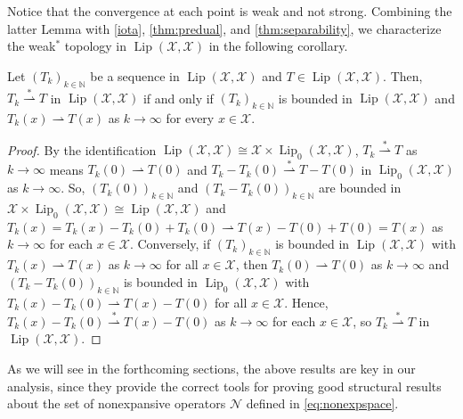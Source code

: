 \documentclass[onefignum,onetabnum]{siamonline250211}
\newcommand{\Lip}{\operatorname{Lip}}
\newcommand{\N}{\mathcal{N}}
\newcommand{\weakk}{\stackrel{\ast}{\rightharpoonup}}
\newcommand{\cX}{\mathcal{X}}
\begin{document}
Notice that the convergence at each point is weak and not strong. Combining the latter Lemma with \cref{iota}, \cref{thm:predual}, and \cref{thm:separability}, we characterize the weak$^*$ topology in $\Lip(\cX, \cX)$ in the following corollary.
\begin{corollary}\label{topo}
Let $(T_k)_{k\in\mathbb{N}}$ be a sequence in $\Lip(\cX, \cX)$ and $T\in\Lip(\cX, \cX)$. Then, $T_k\weakk T$ in $\Lip(\cX, \cX)$ if and only if $(T_k)_{k\in\mathbb{N}}$ is bounded in $\Lip(\cX, \cX)$ and $T_k(x)\rightharpoonup T(x)$ as $k \to \infty$ for every $x\in\cX$.
\end{corollary}

\begin{proof}
By the identification $\Lip(\cX, \cX) \cong  \cX \times \Lip_0(\cX, \cX)$, $T_k\weakk T$ as $k \to \infty$ means $T_k(0) \rightharpoonup T(0)$ and $T_k - T_k(0) \weakk T - T(0)$ in $\Lip_0(\cX, \cX)$ as $k \to \infty$. So, $(T_k(0))_{k\in\mathbb{N}}$ and $(T_k - T_k(0))_{k\in\mathbb{N}}$ are bounded in $\cX \times \Lip_0(\cX, \cX) \cong \Lip(\cX, \cX)$ and $T_k(x) = T_k(x) - T_k(0) + T_k(0) \rightharpoonup T(x) - T(0) + T(0) = T(x)$ as $k \to \infty$ for each $x \in \cX$. Conversely, if $(T_k)_{k\in\mathbb{N}}$ is bounded in $\Lip(\cX, \cX)$ with $T_k(x) \rightharpoonup T(x)$ as $k \to \infty$ for all $x \in \cX$, then $T_k(0) \rightharpoonup T(0)$ as $k\to\infty$ and $(T_k - T_k(0))_{k\in\mathbb{N}}$ is bounded in $\Lip_0(\cX, \cX)$ with $T_k(x) - T_k(0) \rightharpoonup T(x) - T(0)$ for all $x \in \cX$. Hence, $T_k(x) - T_k(0) \weakk T(x) - T(0)$ as $k \to \infty$ for each $x \in \cX$, so $T_k \weakk T$ in $\Lip(\cX, \cX)$.
\end{proof}
As we will see in the forthcoming sections, the above results are key in our analysis, since they provide the correct tools for proving good structural results about the set of nonexpansive operators $\N$ defined in \cref{eq:nonexpspace}.
\end{document}
